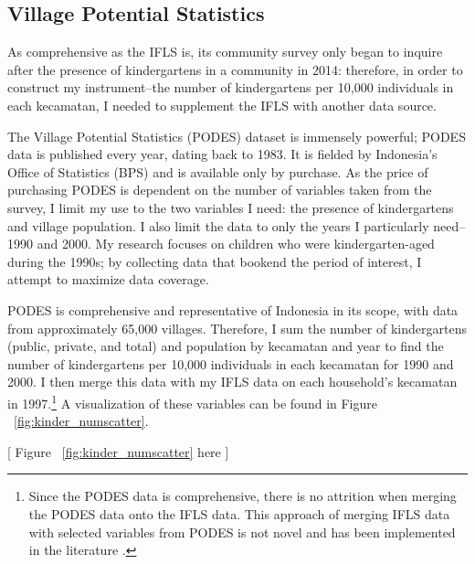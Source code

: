 \subsection{Village Potential Statistics}
	\label{sec:podes}
As comprehensive as the IFLS is, its community survey only began to inquire after the presence of kindergartens in a community in 2014: therefore, in order to construct my instrument--the number of kindergartens per 10,000 individuals in each kecamatan, I needed to supplement the IFLS with another data source.

The Village Potential Statistics (PODES) dataset is immensely powerful; PODES data is published every year, dating back to 1983. It is fielded by Indonesia's Office of Statistics (BPS) and is available only by purchase. As the price of purchasing PODES is dependent on the number of variables taken from the survey, I limit my use to the two variables I need: the presence of kindergartens and village population. I also limit the data to only the years I particularly need--1990 and 2000. My research focuses on children who were kindergarten-aged during the 1990s; by collecting data that bookend the period of interest, I attempt to maximize data coverage.

PODES is comprehensive and representative of Indonesia in its scope, with data from approximately 65,000 villages. Therefore, I sum the number of kindergartens (public, private, and total) and population by kecamatan and year to find the number of kindergartens per 10,000 individuals in each kecamatan for 1990 and 2000. I then merge this data with my IFLS data on each household's kecamatan in 1997.\footnote{Since the PODES data is comprehensive, there is no attrition when merging the PODES data onto the IFLS data. This approach of merging IFLS data with selected variables from PODES is not novel and has been implemented in the literature \citep{Shrestha2021}.} A visualization of these variables can be found in Figure ~\ref{fig:kinder_numscatter}. 
\begin{center}
	[ Figure ~\ref{fig:kinder_numscatter} here ]
\end{center}
